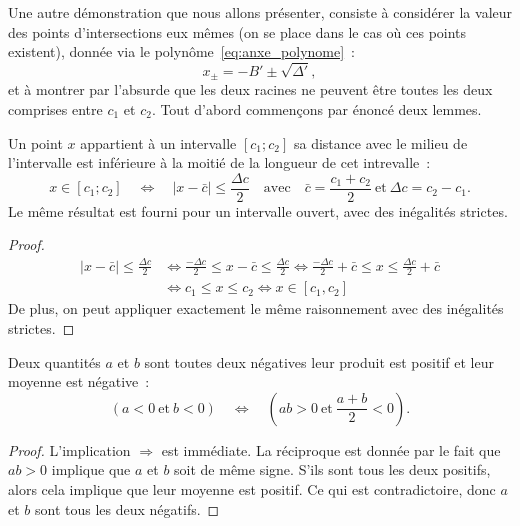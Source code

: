 \documentclass[main.tex]{subfiles}
\begin{document}
Une autre démonstration que nous allons présenter, consiste à considérer la valeur des points d'intersections eux mêmes (on se place dans le cas où ces points existent), donnée via le polynôme~\ref{eq:anxe_polynome}~:
\begin{equation}
\label{eq:anxe_racines}
x_\pm = -B' \pm \sqrt{\Delta'},
\end{equation}
et à montrer par l'absurde que les deux racines ne peuvent être toutes les deux comprises entre $c_1$ et $c_2$. Tout d'abord commençons par énoncé deux lemmes.
\begin{lemme} \label{lem:distance_milieu}
Un point $x$ appartient à un intervalle $[c_1;c_2]$ \ssi sa distance avec le milieu de l'intervalle est inférieure à la moitié de la longueur de cet intrevalle~:
\begin{equation}
x \in [c_1;c_2]
 \quad \Longleftrightarrow \quad 
 | x - \bar{c}  | \leq \frac{\Delta c}{2}  \quad \textrm{avec} \quad \bar{c}=\frac{c_1+c_2}{2} \ \textrm{et} \ \Delta c = c_2-c_1.
\end{equation}
Le même résultat est fourni pour un intervalle ouvert, avec des inégalités strictes.
\end{lemme}
\begin{proof}
\begin{align*}
 | x - \bar{c}  | \leq \frac{\Delta c}{2} & \Longleftrightarrow \frac{-\Delta c}{2} \leq x-\bar{c}\leq \frac{\Delta c }{2}  \Longleftrightarrow \frac{-\Delta c}{2} +\bar{c}\leq x\leq \frac{\Delta c }{2} +\bar{c} \\
 &\Longleftrightarrow c_1 \leq x \leq c_2 \Longleftrightarrow x \in [c_1,c_2]
\end{align*}
De plus, on peut appliquer exactement le même raisonnement avec des inégalités strictes.
\end{proof}
\begin{lemme} \label{lem:qtes_negatives}
Deux quantités $a$ et $b$ sont toutes deux négatives \ssi leur produit est positif et leur moyenne est négative~:
$$ ( a<0\ \textrm{et}\ b<0 ) \quad \Longleftrightarrow \quad \left( ab>0\ \textrm{et}\ \frac{a+b}{2}<0  \right).$$
\end{lemme}
\begin{proof}
L'implication $\Rightarrow$ est immédiate. La réciproque est donnée par le fait que $ab>0$ implique que $a$ et $b$ soit de même signe. S'ils sont tous les deux positifs, alors cela implique que leur moyenne est positif. Ce qui est contradictoire, donc $a$ et $b$ sont tous les deux négatifs.
\end{proof}
\end{document}

